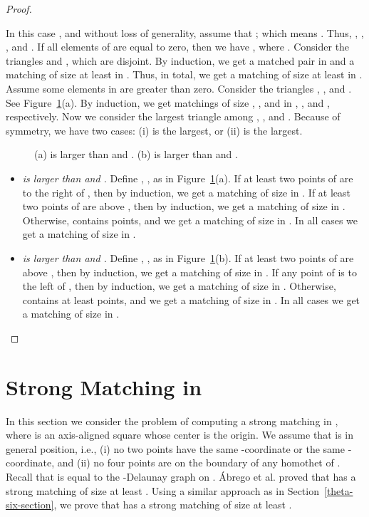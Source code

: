 \documentclass[11pt,a4paper]{article}
\begin{document}
\begin{proof}
\begin{itemize}
In this case , and without loss of generality, assume that ; which means . Thus, , , , and . If all elements of  are equal to zero, then we have , where . Consider the triangles  and , which are disjoint. By induction, we get a matched pair in  and a matching of size at least  in . Thus, in total, we get a matching of size at least  in . Assume some elements in  are greater than zero. Consider the triangles , , and . See Figure~\ref{Theta-six-fig4}(a). By induction, we get matchings of size , , and  in , , and , respectively. 
Now we consider the largest triangle among , , and . Because of symmetry, we have two cases: (i)  is the largest, or (ii)  is the largest.

\begin{figure}[h!]
  \centering
\setlength{\tabcolsep}{0in}
  
  \caption{(a)  is larger than  and . (b)  is larger than  and .}
\label{Theta-six-fig4}
\end{figure}
\begin{itemize}
 \item {\em  is larger than  and .}
Define , ,  as in Figure~\ref{Theta-six-fig4}(a). If at least two points of  are to the right of , then by induction, we get a matching of size  in . If at least two points of  are above , then by induction, we get a matching of size  in . Otherwise,  contains  points, and we get a matching of size  in . In all cases we get a matching of size  in .

\item {\em  is larger than  and .}
Define , ,  as in Figure~\ref{Theta-six-fig4}(b). If at least two points of  are above , then by induction, we get a matching of size  in . If any point of  is to the left of , then by induction, we get a matching of size  in . Otherwise,  contains at least  points, and we get a matching of size  in . In all cases we get a matching of size  in . 
\end{itemize}
\end{itemize}
\end{proof}
\section{Strong Matching in 
}

In this section we consider the problem of computing a strong matching in , where  is an axis-aligned square whose center is the origin. We assume that  is in general position, i.e., (i) no two points have the same -coordinate or the same -coordinate, and (ii) no four points are on the boundary of any homothet of . Recall that  is equal to the -Delaunay graph on . \'{A}brego et al. \cite{Abrego2004, Abrego2009} proved that  has a strong matching of size at least . Using a similar approach as in Section~\ref{theta-six-section}, we prove that  has a strong  matching of size at least .
\end{document}

